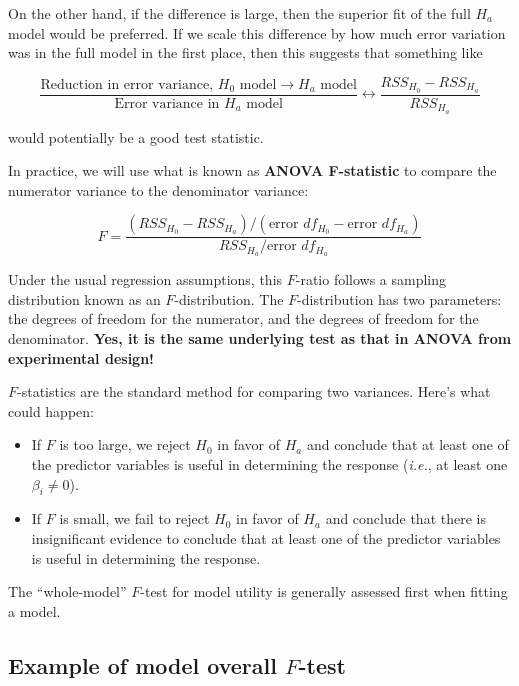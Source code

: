 \documentclass[
]{book}
\begin{document}
On the other hand, if the difference is large, then the superior fit of the full \(H_a\) model would be preferred.
If we scale this difference by how much error variation was in the full model in the first place, then this suggests that something like

\[\frac{\textrm{Reduction in error variance, }H_0 \textrm{ model} \rightarrow H_a\textrm{ model}}{\textrm{Error variance in }H_a \textrm{ model}} \leftrightarrow \frac{RSS_{H_0}-RSS_{H_a}}{RSS_{H_a}}\]

would potentially be a good test statistic.

In practice, we will use what is known as \textbf{ANOVA F-statistic} to compare the numerator variance to the denominator variance:

\[F = \frac{\left(RSS_{H_0}-RSS_{H_a}\right)/\left(\textrm{error }df_{H_0} - \textrm{error } df_{H_a}\right)}{RSS_{H_a}/\textrm{error } df_{H_a}}\]

Under the usual regression assumptions, this \(F\)-ratio follows a sampling distribution known as an \(F\)-distribution.
The \(F\)-distribution has two parameters: the degrees of freedom for the numerator, and the degrees of freedom for the denominator.
\textbf{Yes, it is the same underlying test as that in ANOVA from experimental design!}

\(F\)-statistics are the standard method for comparing two variances.
Here's what could happen:

\begin{itemize}
\item
  If \(F\) is too large, we reject \(H_0\) in favor of \(H_a\) and conclude that at least one of the predictor variables is useful in determining the response (\emph{i.e.}, at least one \(\beta_i \neq 0\)).
\item
  If \(F\) is small, we fail to reject \(H_0\) in favor of \(H_a\) and conclude that there is insignificant evidence to conclude that at least one of the predictor variables is useful in determining the response.
\end{itemize}

The ``whole-model'' \(F\)-test for model utility is generally assessed first when fitting a model.

\hypertarget{example-of-model-overall-f-test}{%
\subsection{\texorpdfstring{Example of model overall \(F\)-test}{Example of model overall F-test}}\label{example-of-model-overall-f-test}}
\end{document}

